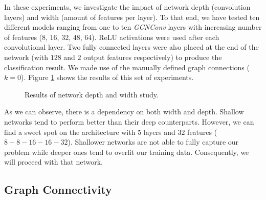 In these experiments, we investigate the impact of network depth (convolution layers) and width (amount of features per layer). To that end, we have tested ten different models ranging from one to ten \emph{GCNConv} layers with increasing number of features ($8$, $16$, $32$, $48$, $64$). ReLU activations were used after each convolutional layer. Two fully connected layers were also placed at the end of the network (with $128$ and $2$ output features respectively) to produce the classification
result. We made use of the manually defined graph connections ($k=0$). Figure \ref{fig:experiments_width_depth} shows the results of this set of experiments.

\begin{figure}[!htb]
  \caption{Results of network depth and width study.}
  \label{fig:experiments_width_depth}
\end{figure}

As we can observe, there is a dependency on both width and depth. Shallow networks tend to perform better than their deep counterparts. However, we can find a sweet spot on the architecture with $5$ layers and $32$ features ($8-8-16-16-32$). Shallower networks are not able to fully capture our problem while deeper ones tend to overfit our training data. Consequently, we will proceed with that network.

\subsection{Graph Connectivity}

